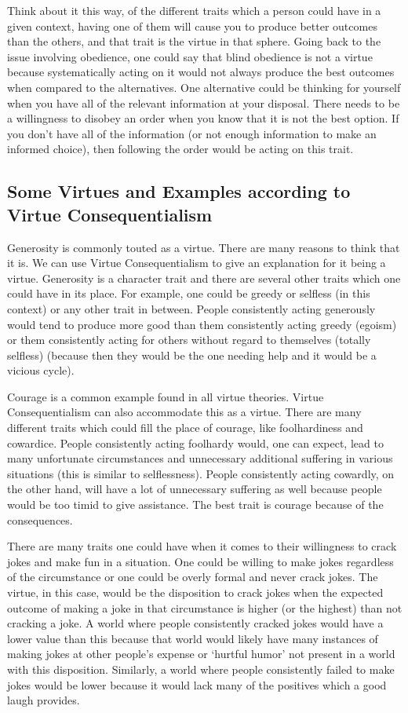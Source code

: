 Think about it this way, of the different traits which a person could have in a given context, having one of them will cause you to produce better outcomes than the others, and that trait is the virtue in that sphere. Going back to the issue involving obedience, one could say that blind obedience is not a virtue because systematically acting on it would not always produce the best outcomes when compared to the alternatives. One alternative could be thinking for yourself when you have all of the relevant information at your disposal. There needs to be a willingness to disobey an order when you know that it is not the best option. If you don't have all of the information (or not enough information to make an informed choice), then following the order would be acting on this trait.  

\subsection{Some Virtues and Examples according to Virtue Consequentialism}

Generosity is commonly touted as a virtue. There are many reasons to think that it is. We can use Virtue Consequentialism to give an explanation for it being a virtue. Generosity is a character trait and there are several other traits which one could have in its place. For example, one could be greedy or selfless (in this context) or any other trait in between. People consistently acting generously would tend to produce more good than them consistently acting greedy (egoism) or them consistently acting for others without regard to themselves (totally selfless) (because then they would be the one needing help and it would be a vicious cycle). 

Courage is a common example found in all virtue theories. Virtue Consequentialism can also accommodate this as a virtue. There are many different traits which could fill the place of courage, like foolhardiness and cowardice. People consistently acting foolhardy would, one can expect, lead to many unfortunate circumstances and unnecessary additional suffering in various situations (this is similar to selflessness). People consistently acting cowardly, on the other hand, will have a lot of unnecessary suffering as well because people would be too timid to give assistance. The best trait is courage because of the consequences.    

There are many traits one could have when it comes to their willingness to crack jokes and make fun in a situation. One could be willing to make jokes regardless of the circumstance or one could be overly formal and never crack jokes. The virtue, in this case, would be the disposition to crack jokes when the expected outcome of making a joke in that circumstance is higher (or the highest) than not cracking a joke. A world where people consistently cracked jokes would have a lower value than this because that world would likely have many instances of making jokes at other people’s expense or ‘hurtful humor’ not present in a world with this disposition. Similarly, a world where people consistently failed to make jokes would be lower because it would lack many of the positives which a good laugh provides.

